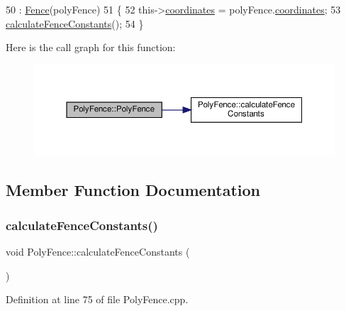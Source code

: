 \begin{DoxyCode}
50         : \hyperlink{class_fence_a5c2be718e885ed9ae2ca048406d126b3}{Fence}(polyFence)
51 \{
52     this->\hyperlink{class_poly_fence_ae8e0c55e745979cab104ef80aeb4b418}{coordinates} = polyFence.\hyperlink{class_poly_fence_ae8e0c55e745979cab104ef80aeb4b418}{coordinates};
53     \hyperlink{class_poly_fence_a229de6f5987bf7d312310b522db0d5a4}{calculateFenceConstants}();
54 \}
\end{DoxyCode}
Here is the call graph for this function\+:\nopagebreak
\begin{figure}[H]
\begin{center}
\leavevmode
\includegraphics[width=350pt]{d1/d22/class_poly_fence_ad95391c8cf7de0e39cb704cfe771101e_cgraph}
\end{center}
\end{figure}


\subsection{Member Function Documentation}
\mbox{\label{class_poly_fence_a229de6f5987bf7d312310b522db0d5a4}} 
\subsubsection{\texorpdfstring{calculate\+Fence\+Constants()}{calculateFenceConstants()}}
{\footnotesize\ttfamily void Poly\+Fence\+::calculate\+Fence\+Constants (\begin{DoxyParamCaption}{ }\end{DoxyParamCaption})}



Definition at line 75 of file Poly\+Fence.\+cpp.


